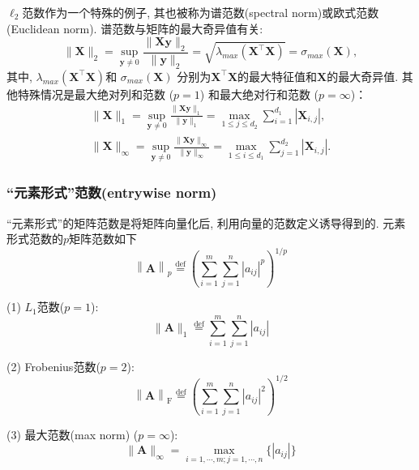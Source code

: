 \documentclass[lang=cn,10pt]{gorgeousnbook}
\numberwithin{equation}{section}%
\numberwithin{figure}{section}%
\begin{document}
$\ell_2$范数作为一个特殊的例子, 其也被称为谱范数(spectral norm)或欧式范数(Euclidean norm). 谱范数与矩阵的最大奇异值有关:
\begin{equation}
	\|\boldsymbol{X}\|_2=\sup\limits_{\boldsymbol{y}\neq0}\frac{\|\boldsymbol{X}\boldsymbol{y}\|_2}{\|\boldsymbol{y}\|_2}=\sqrt{\lambda_{max}(\boldsymbol{X}^\top\boldsymbol{X})}=\sigma_{max}(\boldsymbol{X}),
\end{equation}
其中, $\lambda_{max}(\boldsymbol{X}^\top\boldsymbol{X})$和 $\sigma_{max}(\boldsymbol{X})$ 分别为$\boldsymbol{X}^\top\boldsymbol{X}$的最大特征值和$\boldsymbol{X}$的最大奇异值. 其他特殊情况是最大绝对列和范数 ($p = 1$) 和最大绝对行和范数 ($p = \infty$)：
\begin{equation}
	\begin{gathered}
	\|\boldsymbol{X}\|_{1}=\operatorname*{sup}_{\boldsymbol{y}\neq0}\frac{\|\boldsymbol{X}\boldsymbol{y}\|_{1}}{\|\boldsymbol{y}\|_{1}}=\operatorname*{max}_{1\leq j\leq d_{2}}\sum_{i=1}^{d_{1}}|\boldsymbol{X}_{i,j}|, \\
	\|\boldsymbol{X}\|_{\infty}=\operatorname*{sup}_{\boldsymbol{y}\neq0}\frac{\|\boldsymbol{Xy}\|_{\infty}}{\|\boldsymbol{y}\|_{\infty}}=\operatorname*{max}_{1\leq i\leq d_{1}}\sum_{j=1}^{d_{2}}|\boldsymbol{X}_{i,j}|. 
	\end{gathered}
\end{equation}

\subsubsection{``元素形式”范数(entrywise norm)}
``元素形式”的矩阵范数是将矩阵向量化后, 利用向量的范数定义诱导得到的. 元素形式范数的$p$矩阵范数如下
\begin{equation}
\left\|\boldsymbol{A}\right\|_p\overset{\mathrm{def}}{\operatorname*{=}}\left(\sum_{i=1}^m\sum_{j=1}^n|a_{ij}|^p\right)^{1/p}
\end{equation}

(1) $L_1$范数($p=1$):
\begin{equation}
\|\bm{A}\|_1\stackrel{\mathrm{def}}{=}\sum_{i=1}^m\sum_{j=1}^n|a_{ij}|
\end{equation}

(2) Frobenius范数($p=2$):
\begin{equation}
\left\|\boldsymbol{A}\right\|_{\mathrm{F}}\overset{\mathrm{def}}{=}\left(\sum_{i=1}^{m}\sum_{j=1}^{n}|a_{ij}|^{2}\right)^{1/2}
\end{equation}

(3) 最大范数(max norm) ($p=\infty $):
\begin{equation}
\|\boldsymbol{A}\|_\infty=\max_{i=1,\cdots,m;j=1,\cdots,n}\{|a_{ij}|\}
\end{equation}
\end{document}
